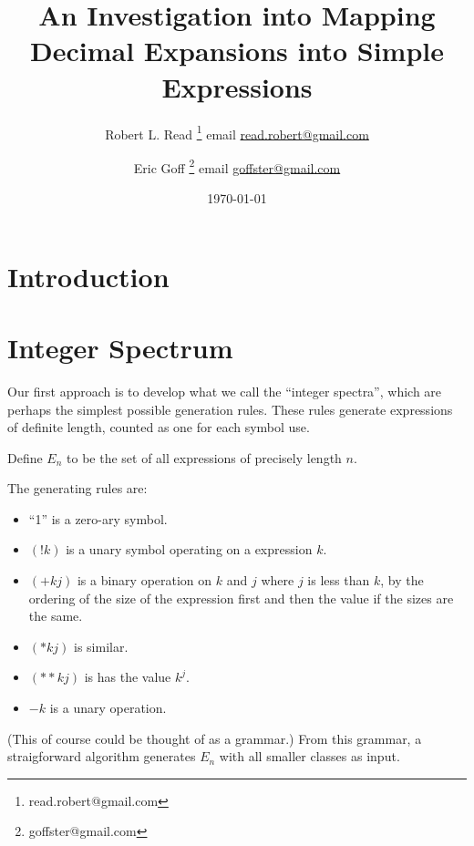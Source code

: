 \documentclass[11pt]{article}
\title{An Investigation into Mapping Decimal Expansions into Simple Expressions}
\author{Robert L. Read
  \thanks{read.robert@gmail.com}
   email \href{mailto:read.robert@gmail.com}{read.robert@gmail.com}
}
\author{Eric Goff
  \thanks{goffster@gmail.com}
  email \href{mailto:goffster@gmail.com}{goffster@gmail.com}
}
\affil{Founder, Public Invention, a non-profit.}
\date{\today}
\begin{document}
\maketitle

\abstract{
  }
\tableofcontents


\section{Introduction}

\section{Integer Spectrum}

Our first approach is to develop what we call the ``integer spectra'', which
are perhaps the simplest possible generation rules.  These rules
generate expressions of definite length, counted as one for each symbol
use.

Define $E_n$ to be the set of all expressions of precisely length $n$.

The generating rules are:
\begin{itemize}
\item ``1'' is a zero-ary symbol.
  \item $(! k)$ is a unary symbol operating on a expression $k$.
  \item $(+ k j)$ is a binary operation on $k$ and $j$ where $j$ is less than $k$, by the ordering of the size of the expression first and then the value
    if the sizes are the same.
  \item $(* k j)$ is similar.
  \item $(** k j)$ is has the value $k^j$.
    \item $-k$ is a unary operation.
\end{itemize}
(This of course could be thought of as a grammar.)
From this grammar, a straigforward algorithm generates $E_n$ with all smaller
classes as input.
\end{document}
